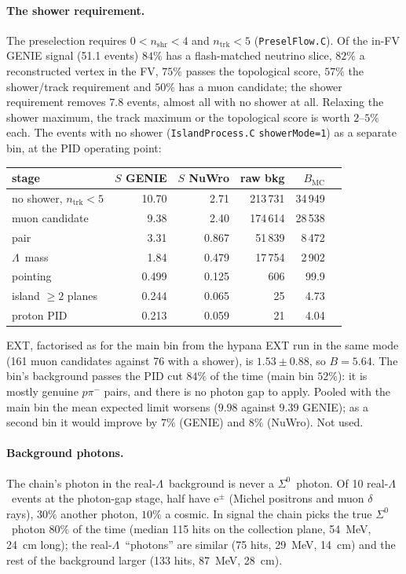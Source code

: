 \documentclass[11pt,a4paper]{article}
\newcommand{\Szero}{\ensuremath{\Sigma^{0}}}
\newcommand{\Lam}{\ensuremath{\Lambda}}
\begin{document}
\paragraph{The shower requirement.} The preselection requires $0<n_{\mathrm{shr}}<4$ and
$n_{\mathrm{trk}}<5$ (\texttt{PreselFlow.C}). Of the in-FV GENIE signal (51.1 events) $84\%$
has a flash-matched neutrino slice, $82\%$ a reconstructed vertex in the FV, $75\%$ passes
the topological score, $57\%$ the shower/track requirement and $50\%$ has a muon candidate;
the shower requirement removes $7.8$ events, almost all with no shower at all. Relaxing the
shower maximum, the track maximum or the topological score is worth $2$--$5\%$ each. The
events with no shower (\texttt{IslandProcess.C} \texttt{showerMode=1}) as a separate bin, at
the PID operating point:
\begin{center}
\small
\begin{tabular}{lrrrrr}
\toprule
stage & $S$ GENIE & $S$ NuWro & raw bkg & $B_{\mathrm{MC}}$ \\
\midrule
no shower, $n_{\mathrm{trk}}<5$ & 10.70 & 2.71 & 213\,731 & 34\,949 \\
muon candidate & 9.38 & 2.40 & 174\,614 & 28\,538 \\
pair & 3.31 & 0.867 & 51\,839 & 8\,472 \\
\Lam\ mass & 1.84 & 0.479 & 17\,754 & 2\,902 \\
pointing & 0.499 & 0.125 & 606 & 99.9 \\
island $\geq2$ planes & 0.244 & 0.065 & 25 & 4.73 \\
proton PID & 0.213 & 0.059 & 21 & 4.04 \\
\bottomrule
\end{tabular}
\end{center}
EXT, factorised as for the main bin from the hypana EXT run in the same mode (161 muon
candidates against 76 with a shower), is $1.53\pm0.88$, so $B=5.64$. The bin's background
passes the PID cut $84\%$ of the time (main bin $52\%$): it is mostly genuine $p\pi^-$
pairs, and there is no photon gap to apply. Pooled with the main bin the mean expected
limit worsens ($9.98$ against $9.39$ GENIE); as a second bin it would improve by $7\%$
(GENIE) and $8\%$ (NuWro). Not used.

\paragraph{Background photons.} The chain's photon in the real-\Lam\ background is never
a \Szero\ photon. Of 10 real-\Lam\ events at the photon-gap stage, half have e$^\pm$
(Michel positrons and muon $\delta$ rays), $30\%$ another photon, $10\%$ a cosmic. In
signal the chain picks the true \Szero\ photon $80\%$ of the time (median 115 hits on the
collection plane, 54~MeV, 24~cm long); the real-\Lam\ ``photons'' are similar (75 hits,
29~MeV, 14~cm) and the rest of the background larger (133 hits, 87~MeV, 28~cm).
\end{document}
